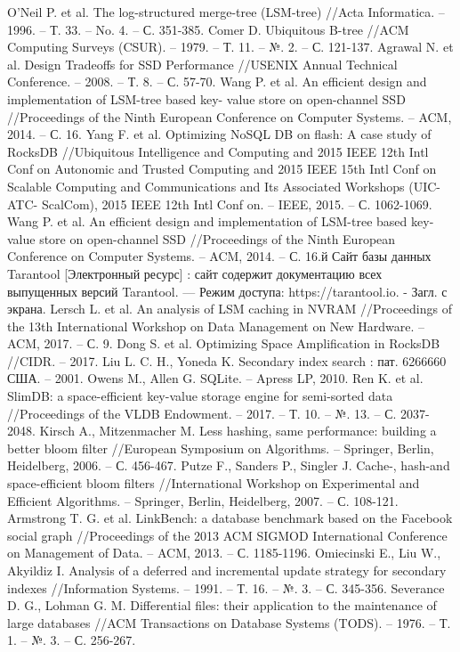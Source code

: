 \documentclass[a4paper,hidelinks,12pt]{article}
\begin{document}
\begin{thebibliography}{9}

 O’Neil P. et al. The log-structured merge-tree (LSM-tree) //Acta Informatica. – 1996. – Т. 33. – No. 4. – С. 351-385.
 Comer D. Ubiquitous B-tree //ACM Computing Surveys (CSUR). – 1979. – Т. 11. – №. 2. – С. 121-137.
 Agrawal N. et al. Design Tradeoffs for SSD Performance //USENIX Annual Technical Conference. – 2008. – Т. 8. – С. 57-70.
 Wang P. et al. An efficient design and implementation of LSM-tree based key- value store on open-channel SSD //Proceedings of the Ninth European Conference on Computer Systems. – ACM, 2014. – С. 16.
 Yang F. et al. Optimizing NoSQL DB on flash: A case study of RocksDB //Ubiquitous Intelligence and Computing and 2015 IEEE 12th Intl Conf on Autonomic and Trusted Computing and 2015 IEEE 15th Intl Conf on Scalable Computing and Communications and Its Associated Workshops (UIC-ATC- ScalCom), 2015 IEEE 12th Intl Conf on. – IEEE, 2015. – С. 1062-1069.
 Wang P. et al. An efficient design and implementation of LSM-tree based key- value store on open-channel SSD //Proceedings of the Ninth European Conference on Computer Systems. – ACM, 2014. – С. 16.й
 Сайт базы данных Tarantool [Электронный ресурс] : сайт содержит документацию всех выпущенных версий Tarantool. — Режим доступа: https://tarantool.io. - Загл. с экрана.
 Lersch L. et al. An analysis of LSM caching in NVRAM //Proceedings of the 13th International Workshop on Data Management on New Hardware. – ACM, 2017. – С. 9.
 Dong S. et al. Optimizing Space Amplification in RocksDB //CIDR. – 2017.
 Liu L. C. H., Yoneda K. Secondary index search : пат. 6266660 США. – 2001.
 Owens M., Allen G. SQLite. – Apress LP, 2010.
 Ren K. et al. SlimDB: a space-efficient key-value storage engine for semi-sorted data //Proceedings of the VLDB Endowment. – 2017. – Т. 10. – №. 13. – С. 2037-2048.
 Kirsch A., Mitzenmacher M. Less hashing, same performance: building a better bloom filter //European Symposium on Algorithms. – Springer, Berlin, Heidelberg, 2006. – С. 456-467.
 Putze F., Sanders P., Singler J. Cache-, hash-and space-efficient bloom filters //International Workshop on Experimental and Efficient Algorithms. – Springer, Berlin, Heidelberg, 2007. – С. 108-121.
 Armstrong T. G. et al. LinkBench: a database benchmark based on the Facebook social graph //Proceedings of the 2013 ACM SIGMOD International Conference on Management of Data. – ACM, 2013. – С. 1185-1196.
 Omiecinski E., Liu W., Akyildiz I. Analysis of a deferred and incremental update strategy for secondary indexes //Information Systems. – 1991. – Т. 16. – №. 3. – С. 345-356.
 Severance D. G., Lohman G. M. Differential files: their application to the maintenance of large databases //ACM Transactions on Database Systems (TODS). – 1976. – Т. 1. – №. 3. – С. 256-267.

\end{thebibliography}
\end{document}
